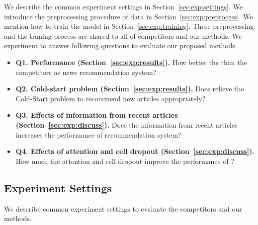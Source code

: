 We describe the common experiment settings in Section~\ref{sec:exp:settings}.
We introduce the preprocessing procedure of data in Section~\ref{sec:exp:preprocess}.
We mention how to train the model in Section~\ref{sec:exp:training}.
These preprocessing and the traning process are shared to all of competitors and our methods.
We experiment to answer following questions to evaluate our proposed methods.
\begin{itemize}
	\item \textbf{Q1. Performance (Section~\ref{sec:exp:results}).}
		How better the \method than the competitors as news recommendation system?
	\item \textbf{Q2. Cold-start problem (Section~\ref{sec:exp:results}).}
		Does \method relieve the Cold-Start problem to recommend new articles appropriately?
	\item \textbf{Q3. Effects of information from recent articles (Section~\ref{sec:exp:discuss}).}
		Does the information from recent articles increases the performance of recommendation system?
	\item \textbf{Q4. Effects of attention and cell dropout (Section~\ref{sec:exp:discuss}).}
		How much the attention and cell dropout improve the performance of \methodname?
\end{itemize}

\subsection{Experiment Settings}
We describe common experiment settings to evaluate the competitors and our methods.
\label{sec:exp:settings}
